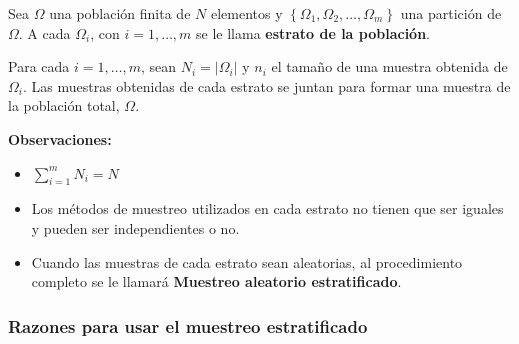 \documentclass[12pt,compress,usenames,dvipsnames,aspectratio=169]{beamer}
\begin{document}
\begin{frame}
    Sea $ \Omega $ una población finita de $ N $ elementos y $ \left\lbrace \Omega_1, \Omega_2, \ldots, \Omega_m \right\rbrace $ una partición de $ \Omega $. A cada $ \Omega_i $, con $ i = 1, \ldots, m $ se le llama \textbf{estrato de la población}. 

    Para cada $ i = 1, \ldots, m $, sean $ N_i = \left| \Omega_i \right| $ y $ n_i $ el tamaño de una muestra obtenida de $ \Omega_i $. Las muestras obtenidas de cada estrato se juntan para formar una muestra de la población total, $ \Omega $.

    \textbf{Observaciones:}

    \begin{itemize}
        \item $ \sum_{i=1}^{m} N_i = N $
        \item Los métodos de muestreo utilizados en cada estrato no tienen que ser iguales y pueden ser independientes o no.
        \item Cuando las muestras de cada estrato sean aleatorias, al procedimiento completo se le llamará \textbf{Muestreo aleatorio estratificado}.
    \end{itemize}
\end{frame}


\begin{frame}
    \frametitle{Razones para usar el muestreo estratificado}

    

\end{frame}
\end{document}
